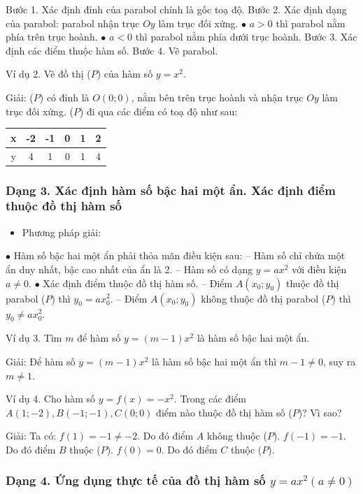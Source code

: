 \documentclass[%
    fontsize=12pt,%
    chapterprefix=false,%
    open=right,%
    twoside=false,%
    numbers=noenddot,%
    headings=optiontohead,%
    final,%
    DIV=15,%
    parskip=half %
]{scrbook}
\begin{document}
    Bước 1. Xác định đỉnh của parabol chính là gốc toạ độ.     Bước 2. Xác định dạng của parabol: parabol nhận trục $ Oy $ làm trục đối xứng.         $\bullet$ $ a > 0 $ thì parabol nằm phía trên trục hoành.         $\bullet$ $ a < 0 $ thì parabol nằm phía dưới trục hoành.     Bước 3. Xác định các điểm thuộc hàm số.     Bước 4. Vẽ parabol.

Ví dụ 2. Vẽ đồ thị ($ P $) của hàm số $ y = x^2 $.

Giải: ($ P $) có đỉnh là $ O(0;0) $, nằm bên trên trục hoành và nhận trục $ Oy $ làm trục đối xứng. ($ P $) đi qua các điểm có toạ độ như sau:

\begin{tabular}{|c|c|c|c|c|c|} \hline x & -2 & -1 & 0 & 1 & 2 \\ \hline y & 4 & 1 & 0 & 1 & 4 \\ \hline \end{tabular}

\subsubsection{Dạng 3. Xác định hàm số bậc hai một ẩn. Xác định điểm thuộc đồ thị hàm số}

\begin{itemize}
  \item Phương pháp giải:
\end{itemize}

  $\bullet$ Hàm số bậc hai một ẩn phải thỏa mãn điều kiện sau:     -- Hàm số chỉ chứa một ẩn duy nhất, bậc cao nhất của ẩn là 2.     -- Hàm số có dạng $ y = ax^2 $ với điều kiện $ a \neq 0 $.   $\bullet$ Xác định điểm thuộc đồ thị hàm số.     -- Điểm $ A(x_0; y_0) $ thuộc đồ thị parabol ($ P $) thì $ y_0 = ax_0^2 $.     -- Điểm $ A(x_0; y_0) $ không thuộc đồ thị parabol ($ P $) thì $ y_0 \neq ax_0^2 $.

Ví dụ 3. Tìm $ m $ để hàm số $ y = (m - 1)x^2 $ là hàm số bậc hai một ẩn.

Giải: Để hàm số $ y = (m - 1)x^2 $ là hàm số bậc hai một ẩn thì $ m - 1 \neq 0 $, suy ra $ m \neq 1 $.

Ví dụ 4. Cho hàm số $ y = f(x) = -x^2 $. Trong các điểm $ A(1; -2), B(-1; -1), C(0; 0) $ điểm nào thuộc đồ thị hàm số ($ P $)? Vì sao?

Giải: Ta có: $ f(1) = -1 \neq -2 $. Do đó điểm $ A $ không thuộc ($ P $). $ f(-1) = -1 $. Do đó điểm $ B $ thuộc ($ P $). $ f(0) = 0 $. Do đó điểm $ C $ thuộc ($ P $).
\subsubsection{Dạng 4. Ứng dụng thực tế của đồ thị hàm số $ y = ax^2 (a \neq 0) $}
\end{document}
